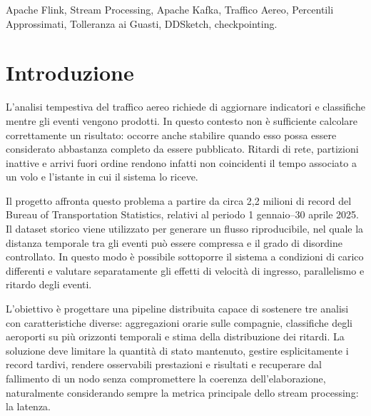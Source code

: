 \documentclass[conference]{IEEEtran}
\begin{document}

\begin{IEEEkeywords}
Apache Flink, Stream Processing, Apache Kafka, Traffico Aereo, Percentili Approssimati, Tolleranza ai Guasti, DDSketch, checkpointing.
\end{IEEEkeywords}




\section{Introduzione}\label{sec:introduction}

L'analisi tempestiva del traffico aereo richiede di aggiornare indicatori e classifiche mentre gli eventi vengono prodotti.
In questo contesto non è sufficiente calcolare correttamente un risultato: occorre anche stabilire quando esso possa essere considerato abbastanza completo da essere pubblicato.
Ritardi di rete, partizioni inattive e arrivi fuori ordine rendono infatti non coincidenti il tempo associato a un volo e l'istante in cui il sistema lo riceve.

Il progetto affronta questo problema a partire da circa 2,2 milioni di record del Bureau of Transportation Statistics, relativi al periodo 1 gennaio--30 aprile 2025.
Il dataset storico viene utilizzato per generare un flusso riproducibile, nel quale la distanza temporale tra gli eventi può essere compressa e il grado di disordine controllato.
In questo modo è possibile sottoporre il sistema a condizioni di carico differenti e valutare separatamente gli effetti di velocità di ingresso, parallelismo e ritardo degli eventi.

L'obiettivo è progettare una pipeline distribuita capace di sostenere tre analisi con caratteristiche diverse: aggregazioni orarie sulle compagnie, classifiche degli aeroporti su più orizzonti temporali e stima della distribuzione dei ritardi.
La soluzione deve limitare la quantità di stato mantenuto, gestire esplicitamente i record tardivi, rendere osservabili prestazioni e risultati e recuperare dal fallimento di un nodo senza compromettere la coerenza dell'elaborazione, naturalmente considerando sempre la metrica principale dello stream processing: la latenza.
\end{document}
